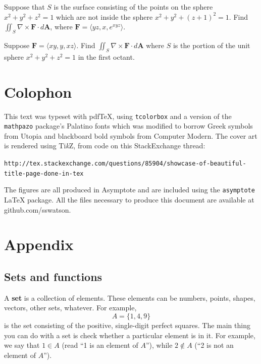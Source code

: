 \documentclass[svgnames]{report}
\begin{document}
\begin{exercise}{}{}
  Suppose that $S$ is the surface consisting of the points on the
  sphere $x^2 + y^2 + z^2 = 1$ which are not inside the sphere
  $x^2 + y^2 + (z+1)^2 = 1$. Find $\iint_{S} \nabla \times \mathbf{F}
  \cdot d\mathbf{A}$, where $\mathbf{F} = \langle yz, x, e^{xyz}
  \rangle$. 
\end{exercise}

\begin{exercise}{}{}
  Suppose $\mathbf{F} = \langle xy, y, xz \rangle$. Find
  $\iint_S \nabla \times \mathbf{F} \cdot d\mathbf{A}$ where $S$ is the portion
  of the unit sphere $x^2 + y^2 + z^2 = 1$ in the first octant.
\end{exercise}

\chapter*{Colophon}

This text was typeset with pdf\TeX, using \texttt{tcolorbox} and a version of the
\texttt{mathpazo} package's Palatino fonts which was modified to borrow
Greek symbols from Utopia and blackboard bold symbols from Computer
Modern. The cover art is rendered using Ti\textit{k}Z, from code on
this StackExchange thread:

\texttt{http://tex.stackexchange.com/questions/85904/showcase-of-beautiful-title-page-done-in-tex}

The figures are all produced in Asymptote and are included using the
\texttt{asymptote} LaTeX package. All the files necessary to produce
this document are available at github.com/sswatson.

\appendix

\chapter{Appendix} 

\section{Sets and functions} 

A \textbf{set} is a collection of elements. These elements can be numbers, points, shapes, vectors, other sets, whatever. For example, 
\[
  A = \{1,4,9\} 
\]
is the set consisting of the positive, single-digit perfect squares. The main thing you can do with a set is check whether a particular element is in it. For example, we say that $1 \in A$ (read ``1 is an element of $A$''), while $2 \notin A$ (``2 is not an element of $A$''). 
\end{document}
